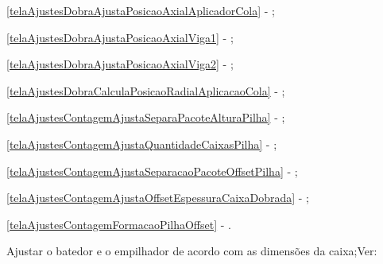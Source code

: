 \begin{procedureAdjustmentNoRecipe}
\begin{foldCount}
    \item[\ding{\dingNumber}] \ref{telaAjustesDobraAjustaPosicaoAxialAplicadorCola} - ;
    \item[\ding{\dingNumber}] \ref{telaAjustesDobraAjustaPosicaoAxialViga1} - ;
    \item[\ding{\dingNumber}] \ref{telaAjustesDobraAjustaPosicaoAxialViga2} - ;
    \item[\ding{\dingNumber}] \ref{telaAjustesDobraCalculaPosicaoRadialAplicacaoCola} - ;
    \item[\ding{\dingNumber}] \ref{telaAjustesContagemAjustaSeparaPacoteAlturaPilha} - ;
    \item[\ding{\dingNumber}] \ref{telaAjustesContagemAjustaQuantidadeCaixasPilha} - ;
    \item[\ding{\dingNumber}] \ref{telaAjustesContagemAjustaSeparacaoPacoteOffsetPilha} - ;
    \item[\ding{\dingNumber}] \ref{telaAjustesContagemAjustaOffsetEspessuraCaixaDobrada} - ;
    \item[\ding{\dingNumber}] \ref{telaAjustesContagemFormacaoPilhaOffset} - .
    
    
  \end{foldCount}

  \fi
  \ifmachineTypeIcv

  \item[\ding{\dingNumber}] Ajustar o batedor e o empilhador de acordo com as dimensões da caixa;Ver:
  

  \begin{stacker}


\end{stacker}
\end{procedureAdjustmentNoRecipe}
